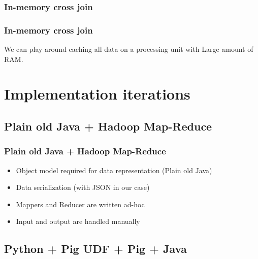 \documentclass[handout]{beamer}
\begin{document}

\subsubsection{In-memory cross join}


\begin{frame}
\frametitle{\bf In-memory cross join}

We can play around caching all data on a processing unit with Large amount of RAM.

\end{frame}


\section{Implementation iterations}

\subsection{Plain old Java + Hadoop Map-Reduce}


\begin{frame}
\frametitle{\bf Plain old Java + Hadoop Map-Reduce}

\begin{itemize}
\item Object model required for data representation (Plain old Java)
\item Data serialization (with JSON in our case)
\item Mappers and Reducer are written ad-hoc
\item Input and output are handled manually
\end{itemize}

\end{frame}


\subsection{Python + Pig UDF + Pig + Java}
\end{document}
